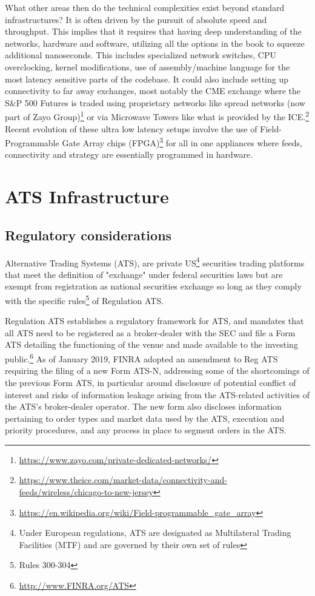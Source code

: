 What other areas then do the technical complexities exist beyond standard infrastructures? It is often driven by the pursuit of absolute speed and throughput. This implies that it requires that having deep understanding of the networks, hardware and software, utilizing all the options in the book to squeeze additional nanoseconds. This includes specialized network switches, CPU overclocking, kernel modifications, use of assembly/machine language for the most latency sensitive parts of the codebase. It could also include setting up connectivity to far away exchanges, most notably the CME exchange where the S\&P 500 Futures is traded using proprietary networks like spread networks (now part of Zayo Group)\footnote{\url{https://www.zayo.com/private-dedicated-networks/}} or via Microwave Towers like what is provided by the ICE.\footnote{\url{https://www.theice.com/market-data/connectivity-and-feeds/wireless/chicago-to-new-jersey}} Recent evolution of these ultra low latency setups involve the use of Field-Programmable Gate Array chips (FPGA)\footnote{\url{https://en.wikipedia.org/wiki/Field-programmable_gate_array}} for all in one appliances where  feeds, connectivity and strategy are essentially programmed in hardware.



\section{ATS Infrastructure}
\subsection{Regulatory considerations}


Alternative Trading Systems (ATS), are private US\footnote{Under European regulations, ATS are designated as Multilateral Trading Facilities (MTF) and are governed by their own set of rules} securities trading platforms that meet the definition of "exchange" under federal securities laws but are exempt from registration as national securities exchange so long as they comply with the specific rules\footnote{Rules 300-304} of Regulation ATS.


Regulation ATS establishes a regulatory framework for ATS, and mandates that all ATS need to be registered as a broker-dealer with the SEC and file a Form ATS detailing the functioning of the venue and made available to the investing public.\footnote{\url{http://www.FINRA.org/ATS}} As of January 2019, FINRA adopted an amendment to Reg ATS requiring the filing of a new Form ATS-N, addressing some of the shortcomings of the previous Form ATS, in particular around disclosure of potential conflict of interest and risks of information leakage arising from the ATS-related activities of the ATS's broker-dealer operator. The new form also discloses information pertaining to order types and market data used by the ATS, execution and priority procedures, and any process in place to segment orders in the ATS.


